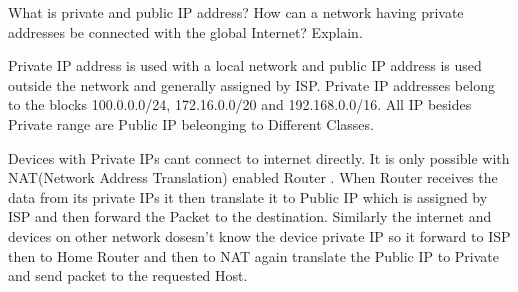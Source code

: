 \documentclass[a4paper,11pt]{article}
\begin{document}
\begin{Q}
    {
        What is private and public IP address? How can a network having private addresses be
        connected with the global Internet? Explain.
    }
\end{Q}
\begin{A}
    {
        Private IP address is used with a local network and public IP address is used outside the network and generally assigned by ISP. Private IP addresses belong to the blocks 100.0.0.0/24, 172.16.0.0/20 and 192.168.0.0/16. All IP besides Private range are Public IP beleonging to Different Classes.

        Devices with Private IPs cant connect to internet directly. It is only possible with NAT(Network Address Translation) enabled Router . When Router receives the data from its private IPs it then translate it to Public IP which is assigned by ISP and then forward the Packet to the destination. Similarly the internet and devices on other network dosesn't know the device private IP so it forward to ISP then to Home Router and then to NAT again translate the Public IP to Private and send packet to the requested Host.
    }
\end{A}
\end{document}
